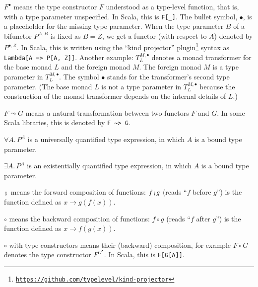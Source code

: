 $F^{\bullet}$ means the type constructor $F$ understood as a type-level
function, \textemdash{} that is, with a type parameter unspecified.
In Scala, this is \lstinline!F[_]!. The bullet symbol, $\bullet$,
is a placeholder for the missing type parameter. When the type parameter
$B$ of a bifunctor $P^{A,B}$ is fixed as $B=Z$, we get a functor
(with respect to $A$) denoted by $P^{\bullet,Z}$. In Scala, this
is written using the \textsf{``}kind projector\textsf{''}
plugin\footnote{\texttt{\href{https://github.com/typelevel/kind-projector}{https://github.com/typelevel/kind-projector}}}
syntax as \lstinline!Lambda[A => P[A, Z]]!. Another example: $T_{L}^{M,\bullet}$
denotes a monad transformer for the base monad $L$ and the foreign
monad $M$. The foreign monad $M$ is a type parameter in $T_{L}^{M,\bullet}$.
The symbol $\bullet$ stands for the transformer\textsf{'}s second type parameter.
(The base monad $L$ is not a type parameter in $T_{L}^{M,\bullet}$
because the construction of the monad transformer depends on the internal
details of $L$.)

$F\leadsto G$ means a natural transformation between two functors
$F$ and $G$. In some Scala libraries, this is denoted by \lstinline!F ~> G!.

$\forall A.\,P^{A}$ is a universally quantified type expression,
in which $A$ is a bound type parameter.

$\exists A.\,P^{A}$ is an existentially quantified type expression,
in which $A$ is a bound type parameter.

$\bef$ means the forward composition
of functions: $f\bef g$ (reads \textsf{``}$f$ before $g$\textsf{''}) is the function
defined as $x\rightarrow g(f(x))$.

$\circ$ means the backward composition
of functions: $f\circ g$ (reads \textsf{``}$f$ after $g$\textsf{''}) is the function
defined as $x\rightarrow f(g(x))$.

$\circ$ with type constructors means their (backward) composition,
for example $F\circ G$ denotes the type constructor $F^{G^{\bullet}}$.
In Scala, this is \lstinline!F[G[A]]!. 

